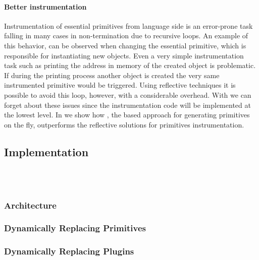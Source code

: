 \paragraph{Better instrumentation}
Instrumentation of essential primitives from language side is an error-prone task falling in many cases in non-termination due to recursive loops. 
An example of this behavior, can be observed when changing the essential  primitive, which is responsible for instantiating new objects.
Even a very simple instrumentation task such as printing the address in memory of the created object is problematic.
If during the printing process another object is created the very same instrumented  primitive would be triggered.
Using reflective techniques it is possible to avoid this loop, however, with a considerable overhead.
With \WF we can forget about these issues since the instrumentation code will be implemented at the lowest level.
In  we show how \WF, the \B based approach for generating primitives on the fly, outperforms the reflective solutions for primitives instrumentation. 


\subsection{Implementation}
 \\
 \\

\subsubsection*{Architecture}

\subsubsection*{Dynamically Replacing Primitives}

\subsubsection*{Dynamically Replacing Plugins}


